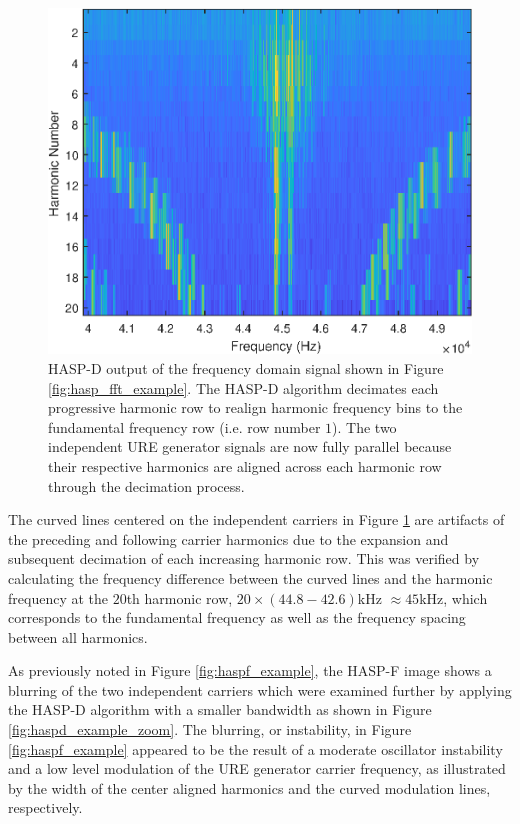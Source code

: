 \begin{figure}[tp]
	\includegraphics[width=\textwidth]{./dasp_algorithm_results/hasp_d_filenum_9601.eps}
	\centering
	\caption{HASP-D output of the frequency domain signal shown in Figure \ref{fig:hasp_fft_example}.  The HASP-D algorithm decimates each progressive harmonic row to realign harmonic frequency bins to the fundamental frequency row (i.e. row number $1$).  The two independent URE generator signals are now fully parallel because their respective harmonics are aligned across each harmonic row through the decimation process.}
	\label{fig:haspd_example}
\end{figure}

The curved lines centered on the independent carriers in Figure \ref{fig:haspd_example} are artifacts of the preceding and following carrier harmonics due to the expansion and subsequent decimation of each increasing harmonic row.  This was verified by calculating the frequency difference between the curved lines and the harmonic frequency at the $20$th harmonic row, $20 \times (44.8 - 42.6)$kHz $\approx 45$kHz, which corresponds to the fundamental frequency as well as the frequency spacing between all harmonics.

As previously noted in Figure \ref{fig:haspf_example}, the HASP-F image shows a blurring of the two independent carriers which were examined further by applying the HASP-D algorithm with a smaller bandwidth as shown in Figure \ref{fig:haspd_example_zoom}. The blurring, or instability, in Figure \ref{fig:haspf_example} appeared to be the result of a moderate oscillator instability and a low level modulation of the URE generator carrier frequency, as illustrated by the width of the center aligned harmonics and the curved modulation lines, respectively.  

